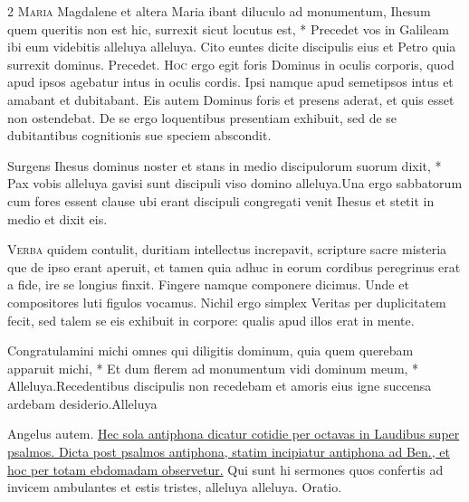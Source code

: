 \begin{multicols*}{2}
\lettrine[lines=2]{\zallmancaps \color{Blue} M}{aria} \hypertarget{maria-magdalene}{\label{maria-magdalene}} Magdalene et altera Maria ibant diluculo ad monumentum, Ihesum quem queritis non est hic, surrexit sicut locutus est, * Precedet vos in Galileam ibi eum videbitis alleluya alleluya. \V Cito euntes dicite discipulis eius et Petro quia surrexit dominus. Precedet.
\lettrine[lines=2]{\zallmancaps \color{Red} H}{oc} ergo egit foris Dominus in oculis corporis, quod apud ipsos agebatur intus in oculis cordis. Ipsi namque apud semetipsos intus et amabant et dubitabant. Eis autem Dominus foris et presens aderat, et quis esset non ostendebat. De se ergo loquentibus presentiam exhibuit, sed de se dubitantibus cognitionis sue speciem abscondit.
\begin{responsory}
{Surgens Ihesus dominus noster et stans in medio discipulorum suorum dixit, * Pax vobis alleluya gavisi sunt discipuli viso domino alleluya.}{Una ergo sabbatorum cum fores essent clause ubi erant discipuli congregati venit Ihesus et stetit in medio et dixit eis.}
\end{responsory}%
\lettrine[lines=2]{\zallmancaps \color{Blue} V}{erba} quidem contulit, duritiam intellectus increpavit, scripture sacre misteria que de ipso erant aperuit, et tamen quia adhuc in eorum cordibus peregrinus erat a fide, ire se longius finxit. Fingere namque componere dicimus. Unde et compositores luti figulos vocamus. Nichil ergo simplex Veritas per duplicitatem fecit, sed talem se eis exhibuit in corpore: qualis apud illos erat in mente.
\begin{responsory-final}
{Congratulamini michi omnes qui diligitis dominum, quia quem querebam apparuit michi, * Et dum flerem ad monumentum vidi dominum meum, * Alleluya.}{Recedentibus discipulis non recedebam et amoris eius igne succensa ardebam desiderio.}{Alleluya}
\end{responsory-final}%
 Angelus autem. \ul{Hec sola antiphona dicatur cotidie per octavas in Laudibus super psalmos. Dicta post psalmos antiphona, statim incipiatur antiphona ad Ben., et hoc per totam ebdomadam observetur.}
 Qui sunt hi sermones quos confertis ad invicem ambulantes et estis tristes, alleluya alleluya. {\color{Red} Oratio.}

\end{multicols*}
